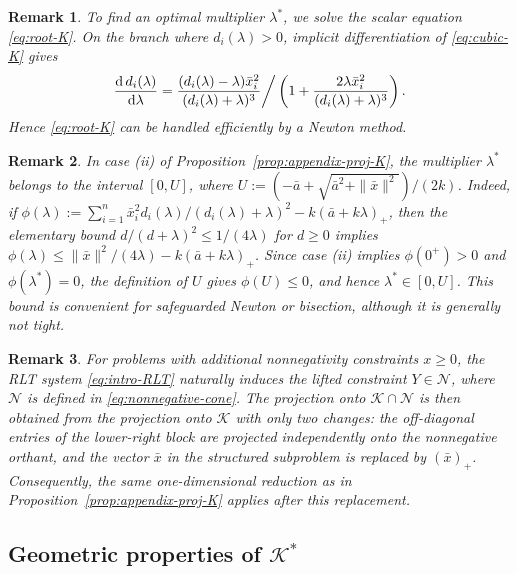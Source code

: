 \documentclass[11pt]{article}
\def\K{\mathcal{K}}
\theoremstyle{plain}
\newtheorem{remark}{Remark}
\begin{document}
\begin{remark}
\label{rem:appendix-proj-K-newton}
To find an optimal multiplier $\lambda^*$, we solve the scalar equation \eqref{eq:root-K}. On the branch where $d_i(\lambda)>0$, implicit differentiation of \eqref{eq:cubic-K} gives
\[
\frac{{\rm d}\, d_i(\lambda)}{{\rm d}\lambda}
=
\frac{(d_i(\lambda)-\lambda)\bar x_i^2}{(d_i(\lambda)+\lambda)^3}
\bigg/
\left(1+\frac{2\lambda \bar x_i^2}{(d_i(\lambda)+\lambda)^3}\right).
\]
Hence \eqref{eq:root-K} can be handled efficiently by a Newton method.
\end{remark}

\begin{remark}
In case {\rm(ii)} of Proposition~\ref{prop:appendix-proj-K}, the multiplier $\lambda^*$ belongs to the interval $[0,U]$, where $U:=(-\bar a+\sqrt{\bar a^2+\|\bar x\|^2})/(2k)$.
Indeed, if
$\phi(\lambda):=\sum_{i=1}^n \bar x_i^2 d_i(\lambda)/(d_i(\lambda)+\lambda)^2-k(\bar a+k\lambda)_+$,
then the elementary bound $d/(d+\lambda)^2\le 1/(4\lambda)$ for $d\ge 0$ implies
$\phi(\lambda)\le \|\bar x\|^2/(4\lambda)-k(\bar a+k\lambda)_+$.
Since case {\rm(ii)} implies $\phi(0^+)>0$ and $\phi(\lambda^*)=0$, the definition of $U$ gives $\phi(U)\le 0$, and hence $\lambda^*\in[0,U]$. This bound is convenient for safeguarded Newton or bisection, although it is generally not tight.
\end{remark}


\begin{remark}
For problems with additional nonnegativity constraints $x\ge 0$, the RLT system \eqref{eq:intro-RLT} naturally induces the lifted constraint $Y\in\mathcal N$, where \(\mathcal N\) is defined in \eqref{eq:nonnegative-cone}. The projection onto $\K\cap\mathcal N$ is then obtained from the projection onto $\K$ with only two changes: the off-diagonal entries of the lower-right block are projected independently onto the nonnegative orthant, and the vector $\bar x$ in the structured subproblem is replaced by $(\bar x)_+$. Consequently, the same one-dimensional reduction as in Proposition~\ref{prop:appendix-proj-K} applies after this replacement.
\end{remark}










\subsection{Geometric properties of \texorpdfstring{$\K^*$}{K*}}\label{subsec:property-Kstar}
\end{document}
